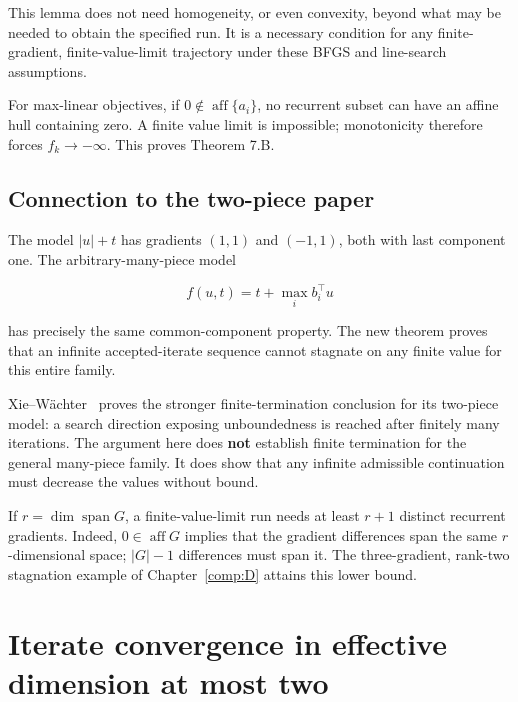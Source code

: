 This lemma does not need homogeneity, or even convexity, beyond what may
be needed to obtain the specified run. It is a necessary condition for
any finite-gradient, finite-value-limit trajectory under these BFGS and
line-search assumptions.

For max-linear objectives, if \(0\notin\operatorname{aff}\{a_i\}\), no
recurrent subset can have an affine hull containing zero. A finite value
limit is impossible; monotonicity therefore forces \(f_k\to-\infty\).
This proves Theorem 7.B.



\subsection{Connection to the two-piece
paper}\label{H:connection-to-the-two-piece-paper}


The model \(|u|+t\) has gradients \((1,1)\) and \((-1,1)\), both with
last component one. The arbitrary-many-piece model

\[
f(u,t)=t+\max_i b_i^\top u
\]

has precisely the same common-component property. The new theorem proves
that an infinite accepted-iterate sequence cannot stagnate on any finite
value for this entire family.

Xie--W\"achter~\cite{XW} proves the stronger finite-termination conclusion
for its two-piece model: a search direction exposing unboundedness is
reached after finitely many iterations. The argument here does
\textbf{not} establish finite termination for the general many-piece
family. It does show that any infinite admissible continuation must
decrease the values without bound.

If \(r=\dim\operatorname{span}G\), a finite-value-limit run needs at
least \(r+1\) distinct recurrent gradients. Indeed,
\(0\in\operatorname{aff}G\) implies that the gradient differences span
the same \(r\)-dimensional space; \(|G|-1\) differences must span it.
The three-gradient, rank-two stagnation example of Chapter~\ref{comp:D} attains this
lower bound.


\setcounter{section}{6}
\setcounter{theorem}{0}
\setcounter{lemma}{0}
\setcounter{corollary}{0}
\setcounter{proposition}{0}
\setcounter{remark}{0}
\setcounter{equation}{0}


\section{Iterate convergence in effective dimension at most
two}\label{H:iterate-convergence-in-effective-dimension-at-most-two}

